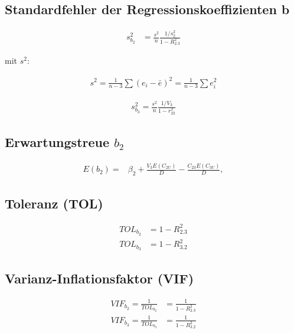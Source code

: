 \documentclass[
  10pt,
  letterpaper,
  a4paper, twoside]{scrreprt}
\begin{document}
\subsection*{Standardfehler der Regressionskoeffizienten
b}\label{standardfehler-der-regressionskoeffizienten-b}

\begin{align} 
s_{b_2}^2&=\frac{s^2}{n} \frac{1 / s^2_2}{1-R_{2.3}^2} 
\end{align}

mit \(s^2\):

\begin{align}
s^2=\frac{1}{n-3} \sum\left(e_i-\bar{e}\right)^2=\frac{1}{n-3} \sum e_i^2 
\end{align}

\begin{align} 
s_{b_3}^2=\frac{s^2}{n} \frac{1 / V_3}{1-r_{23}^2}
\end{align}

\subsection*{\texorpdfstring{Erwartungstreue
\(b_2\)}{Erwartungstreue b\_2}}\label{erwartungstreue-b_2}

\begin{align}
E\left(b_2\right)=&\beta_2+\frac{V_3 E\left(C_{2 U}\right)}{D}-\frac{C_{23} E\left(C_{3 U}\right)}{D},
\end{align}

\subsection*{Toleranz (TOL)}\label{toleranz-tol}

\begin{align}
  TOL_{b_2} &=1-R_{2.3}^2 \label{eq:TOL2}\\
  TOL_{b_3} &=1-R_{3.2}^2 \label{eq:TOL3}
\end{align}

\subsection*{Varianz-Inflationsfaktor
(VIF)}\label{varianz-inflationsfaktor-vif}

\begin{align}
  VIF_{b_2} = \frac{1}{TOL_{b_2}}  &=\frac{1}{1-R_{2.3}^2} \label{eq:VIF2}\\
  VIF_{b_3} = \frac{1}{TOL_{b_3}}  &=\frac{1}{1-R_{3.2}^2} \label{eq:VIF3}
\end{align}
\end{document}
